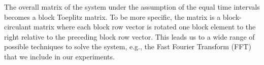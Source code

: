 The overall matrix of the system under the assumption of the equal time intervals becomes a block Toeplitz matrix. To be more specific, the matrix is a block-circulant matrix where each block row vector is rotated one block element to the right relative to the preceding block row vector. This leads us to a wide range of possible techniques to solve the system, e.g., the Fast Fourier Transform (FFT) \cite{mazancourt1983, vescovo1997} that we include in our experiments.

